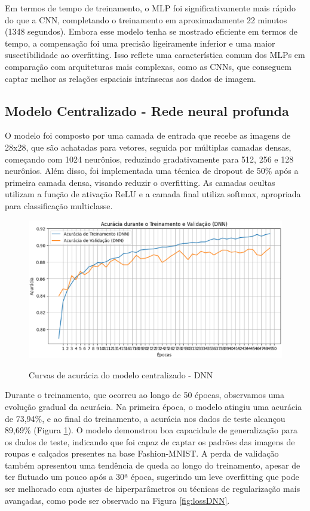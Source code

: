 Em termos de tempo de treinamento, o MLP foi significativamente mais rápido do que a CNN, completando o treinamento em aproximadamente 22 minutos (1348 segundos). Embora esse modelo tenha se mostrado eficiente em termos de tempo, a compensação foi uma precisão ligeiramente inferior e uma maior suscetibilidade ao overfitting. Isso reflete uma característica comum dos MLPs em comparação com arquiteturas mais complexas, como as CNNs, que conseguem captar melhor as relações espaciais intrínsecas aos dados de imagem.

\subsection{Modelo Centralizado - Rede neural profunda}

O modelo foi composto por uma camada de entrada que recebe as imagens de 28x28, que são achatadas para vetores, seguida por múltiplas camadas densas, começando com 1024 neurônios, reduzindo gradativamente para 512, 256 e 128 neurônios. Além disso, foi implementada uma técnica de dropout de 50\% após a primeira camada densa, visando reduzir o overfitting. As camadas ocultas utilizam a função de ativação ReLU e a camada final utiliza softmax, apropriada para classificação multiclasse.

\begin{figure}[ht]
    \centering
    \caption{Curvas de acurácia do modelo centralizado - DNN}
    \includegraphics[scale=0.4]{figuras/analiseResultados/acuracyDNN.eps}
    \label{fig:acuracyDNN}
\end{figure}

Durante o treinamento, que ocorreu ao longo de 50 épocas, observamos uma evolução gradual da acurácia. Na primeira época, o modelo atingiu uma acurácia de 73,94\%, e ao final do treinamento, a acurácia nos dados de teste alcançou 89,69\% (Figura \ref{fig:acuracyDNN}). O modelo demonstrou boa capacidade de generalização para os dados de teste, indicando que foi capaz de captar os padrões das imagens de roupas e calçados presentes na base Fashion-MNIST. A perda de validação também apresentou uma tendência de queda ao longo do treinamento, apesar de ter flutuado um pouco após a 30ª época, sugerindo um leve overfitting que pode ser melhorado com ajustes de hiperparâmetros ou técnicas de regularização mais avançadas, como pode ser observado na Figura \ref{fig:lossDNN}.


